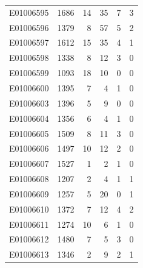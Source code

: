 \documentclass[
  letterpaper,
  DIV=11,
  numbers=noendperiod]{scrreprt}
\begin{document}
\begin{tabular}{lrrrrr}
E01006595     &    1686 &      14 &                    35 &                               7 &                       3 \\
E01006596     &    1379 &       8 &                    57 &                               5 &                       2 \\
E01006597     &    1612 &      15 &                    35 &                               4 &                       1 \\
E01006598     &    1338 &       8 &                    12 &                               3 &                       0 \\
E01006599     &    1093 &      18 &                    10 &                               0 &                       0 \\
E01006600     &    1395 &       7 &                     4 &                               1 &                       0 \\
E01006603     &    1396 &       5 &                     9 &                               0 &                       0 \\
E01006604     &    1356 &       6 &                     4 &                               1 &                       0 \\
E01006605     &    1509 &       8 &                    11 &                               3 &                       0 \\
E01006606     &    1497 &      10 &                    12 &                               2 &                       0 \\
E01006607     &    1527 &       1 &                     2 &                               1 &                       0 \\
E01006608     &    1207 &       2 &                     4 &                               1 &                       1 \\
E01006609     &    1257 &       5 &                    20 &                               0 &                       1 \\
E01006610     &    1372 &       7 &                    12 &                               4 &                       2 \\
E01006611     &    1274 &      10 &                     6 &                               1 &                       0 \\
E01006612     &    1480 &       7 &                     5 &                               3 &                       0 \\
E01006613     &    1346 &       2 &                     9 &                               2 &                       1 \\

\end{tabular}
\end{document}

